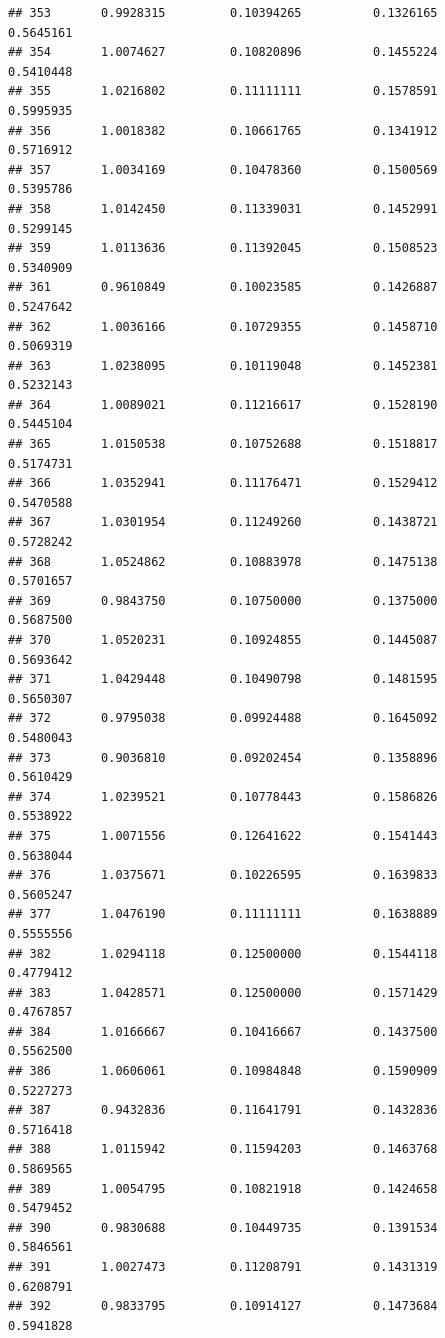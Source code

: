 \documentclass[]{article}
\begin{document}
\begin{verbatim}
## 353       0.9928315         0.10394265          0.1326165        0.5645161
## 354       1.0074627         0.10820896          0.1455224        0.5410448
## 355       1.0216802         0.11111111          0.1578591        0.5995935
## 356       1.0018382         0.10661765          0.1341912        0.5716912
## 357       1.0034169         0.10478360          0.1500569        0.5395786
## 358       1.0142450         0.11339031          0.1452991        0.5299145
## 359       1.0113636         0.11392045          0.1508523        0.5340909
## 361       0.9610849         0.10023585          0.1426887        0.5247642
## 362       1.0036166         0.10729355          0.1458710        0.5069319
## 363       1.0238095         0.10119048          0.1452381        0.5232143
## 364       1.0089021         0.11216617          0.1528190        0.5445104
## 365       1.0150538         0.10752688          0.1518817        0.5174731
## 366       1.0352941         0.11176471          0.1529412        0.5470588
## 367       1.0301954         0.11249260          0.1438721        0.5728242
## 368       1.0524862         0.10883978          0.1475138        0.5701657
## 369       0.9843750         0.10750000          0.1375000        0.5687500
## 370       1.0520231         0.10924855          0.1445087        0.5693642
## 371       1.0429448         0.10490798          0.1481595        0.5650307
## 372       0.9795038         0.09924488          0.1645092        0.5480043
## 373       0.9036810         0.09202454          0.1358896        0.5610429
## 374       1.0239521         0.10778443          0.1586826        0.5538922
## 375       1.0071556         0.12641622          0.1541443        0.5638044
## 376       1.0375671         0.10226595          0.1639833        0.5605247
## 377       1.0476190         0.11111111          0.1638889        0.5555556
## 382       1.0294118         0.12500000          0.1544118        0.4779412
## 383       1.0428571         0.12500000          0.1571429        0.4767857
## 384       1.0166667         0.10416667          0.1437500        0.5562500
## 386       1.0606061         0.10984848          0.1590909        0.5227273
## 387       0.9432836         0.11641791          0.1432836        0.5716418
## 388       1.0115942         0.11594203          0.1463768        0.5869565
## 389       1.0054795         0.10821918          0.1424658        0.5479452
## 390       0.9830688         0.10449735          0.1391534        0.5846561
## 391       1.0027473         0.11208791          0.1431319        0.6208791
## 392       0.9833795         0.10914127          0.1473684        0.5941828

\end{verbatim}
\end{document}
